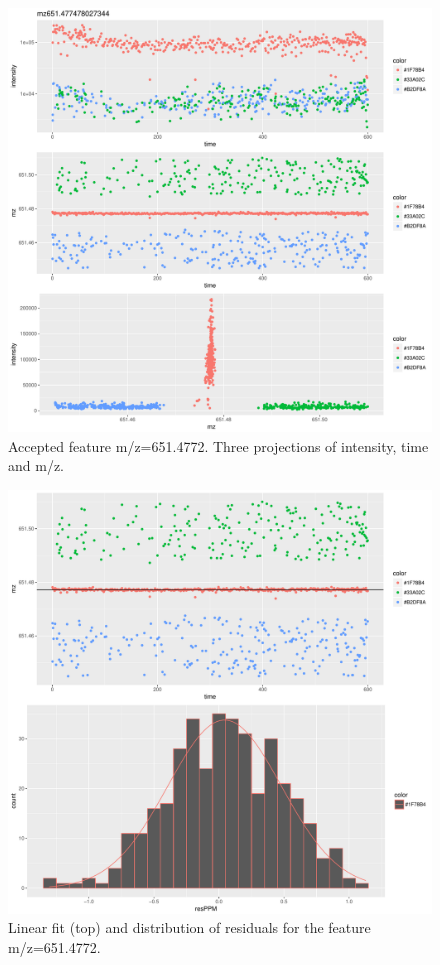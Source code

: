 \documentclass[]{article}
\begin{document}
\begin{figure}[H]
\begin{center}
\includegraphics{Supplementary_document_files/figure-latex/cluster.mz.651-1.pdf}
\caption{Accepted feature m/z=651.4772. Three projections of intensity, time and m/z.}
\label{fig:d3.mz.651.4772}
\end{center}
\end{figure}


\begin{figure}[H]
\begin{center}
\includegraphics{Supplementary_document_files/figure-latex/filter.lm.651-1.pdf}
\caption{Linear fit (top) and distribution of residuals for the  feature m/z=651.4772.}
\label{ig:chk.mz.651.4772}
\end{center}
\end{figure}
\end{document}
